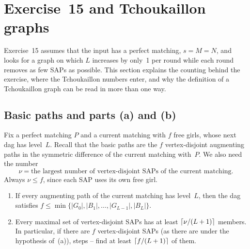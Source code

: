 \section{Exercise~15 and Tchoukaillon graphs}
\label{sec:ex15}

Exercise~15 assumes that the input has a perfect matching, $s=M=N$, and
looks for a graph on which $L$ increases by only~1 per round while each
round removes as few SAPs as possible. This section explains the
counting behind the exercise, where the Tchoukaillon numbers enter, and
why the definition of a Tchoukaillon graph can be read in more than one
way.

\subsection{Basic paths and parts (a) and (b)}

Fix a perfect matching $P$ and a current matching with $f$ free girls,
whose next dag has level~$L$. Recall that the basic paths are the $f$
vertex-disjoint augmenting paths in the symmetric difference of the
current matching with~$P$. We also need the number
\[
   \nu=\text{the largest number of vertex-disjoint SAPs of the current matching}.
\]
Always $\nu\le f$, since each SAP uses its own free girl.

\begin{lemma}[Exercise~15(a), (b)]
\label{lem:15ab}
\leavevmode
\begin{enumerate}[label=(\alph*)]
\item If every augmenting path of the current matching has level~$L$, then
  the dag satisfies
  \(f\le\min\{|G_0|,|B_1|,\ldots,|G_{L-1}|,|B_L|\}\).
\item Every maximal set of vertex-disjoint SAPs has at least
  $\lceil\nu/(L+1)\rceil$ members. In particular, if there are $f$
  vertex-disjoint SAPs (as there are under the hypothesis of~(a)), steps
  -- find at least $\lceil f/(L+1)\rceil$ of them.
\end{enumerate}
\end{lemma}

